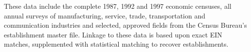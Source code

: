 These data include the complete 1987, 1992 and 1997 economic censuses, all 
annual surveys of manufacturing, service, trade, transportation and 
communication industries and selected, approved fields from the Census 
Bureau's establishment master file.%
Linkage to these data is based upon 
exact EIN matches, supplemented with statistical matching to recover 
establishments.

% 
% 
%
%



